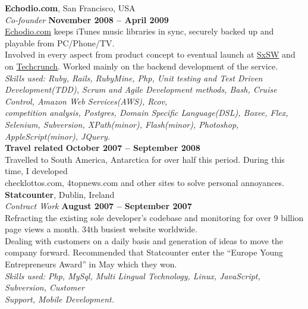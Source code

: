 \documentclass[margin,line]{resume}
\begin{document}
\begin{resume}
    \textbf{Echodio.com}, San Francisco, USA \vspace{2mm}\\\vspace{1mm}%
    \textsl{Co-founder} \hfill \textbf{November 2008 -- April 2009}\\
    \href{http://echodio.com}{Echodio.com} keeps iTunes music libraries in sync, securely backed up and playable from PC/Phone/TV. \vspace{1mm}\\%
    Involved in every aspect from product concept to eventual launch at \href{http://sxsw.com/about/history}{SxSW} and on \href{http://techcrunch.com/2009/03/17/echodio-lets-you-sync-your-itunes-to-the-cloud-300-invites/}{Techcrunch}. Worked mainly on the backend development of the service. \vspace{1mm}\vspace{1mm}\\%
    \textsl{Skills used: Ruby, Rails, RubyMine, Php, Unit testing and Test Driven Development(TDD), Scrum and Agile Development methods, Bash, Cruise Control, Amazon Web Services(AWS), Rcov, \\competition analysis, Postgres, Domain Specific Language(DSL), Boxee, Flex, Selenium, Subversion, XPath(minor), Flash(minor), Photoshop, AppleScript(minor), JQuery. } \vspace{1mm}\\%

    \textbf{Travel related} \hfill \textbf{October 2007 -- September 2008}\\\vspace{1mm}%
    Travelled to South America, Antarctica for over half this period. During this time, I developed \\ checklottos.com, 4topnews.com and other sites to solve personal annoyances. \vspace{1mm}\\%

    \textbf{Statcounter}, Dublin, Ireland \vspace{2mm}\\\vspace{1mm}%
    \textsl{Contract Work} \hfill \textbf{August 2007 -- September 2007}\\
    Refracting the existing sole developer's codebase  and monitoring for over 9 billion page views a month. 34th busiest website worldwide. \vspace{1mm}\\%
    Dealing with customers on a daily basis and generation of ideas to move the company forward. Recommended that Statcounter enter the ``Europe Young Entrepreneurs Award'' in May which they won.\vspace{1mm}\\%
    \textsl{Skills used: Php, MySql, Multi Lingual Technology, Linux, JavaScript, Subversion, Customer \\ Support, Mobile Development.}\vspace{1mm}\\%



\end{resume}
\end{document}
